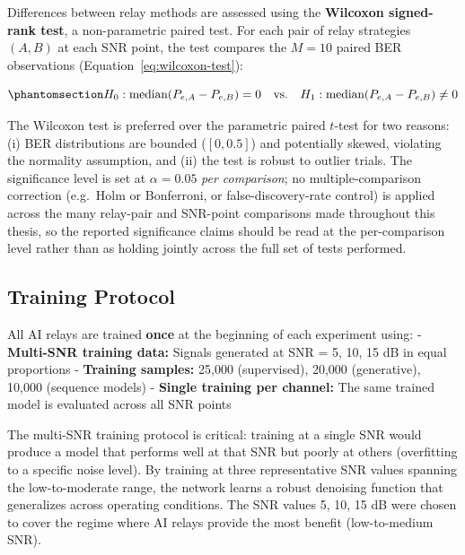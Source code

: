 Differences between relay methods are assessed using the \textbf{Wilcoxon signed-rank test}, a non-parametric paired test. For each pair of relay strategies \((A, B)\) at each SNR point, the test compares the \(M = 10\) paired BER observations (Equation~\ref{eq:wilcoxon-test}):

\begin{equation}\protect\phantomsection\label{eq:wilcoxon-test}{H_0: \text{median}(P_{e,A} - P_{e,B}) = 0 \quad \text{vs.} \quad H_1: \text{median}(P_{e,A} - P_{e,B}) \neq 0
}\end{equation}

The Wilcoxon test is preferred over the parametric paired \(t\)-test for two reasons: (i) BER distributions are bounded (\([0, 0.5]\)) and potentially skewed, violating the normality assumption, and (ii) the test is robust to outlier trials. The significance level is set at \(\alpha = 0.05\) \emph{per comparison}; no multiple-comparison correction (e.g.\ Holm or Bonferroni, or false-discovery-rate control) is applied across the many relay-pair and SNR-point comparisons made throughout this thesis, so the reported significance claims should be read at the per-comparison level rather than as holding jointly across the full set of tests performed.

\subsection{Training Protocol}\label{sec:training-protocol}

All AI relays are trained \textbf{once} at the beginning of each experiment using: - \textbf{Multi-SNR training data:} Signals generated at SNR = 5, 10, 15 dB in equal proportions - \textbf{Training samples:} 25,000 (supervised), 20,000 (generative), 10,000 (sequence models) - \textbf{Single training per channel:} The same trained model is evaluated across all SNR points

The multi-SNR training protocol is critical: training at a single SNR would produce a model that performs well at that SNR but poorly at others (overfitting to a specific noise level). By training at three representative SNR values spanning the low-to-moderate range, the network learns a robust denoising function that generalizes across operating conditions. The SNR values 5, 10, 15 dB were chosen to cover the regime where AI relays provide the most benefit (low-to-medium SNR).

